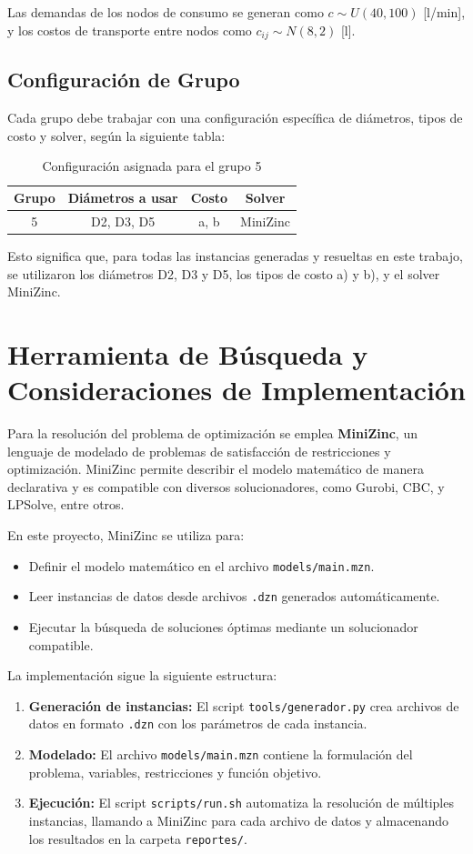 \documentclass[a4paper,12pt]{article}
\begin{document}
Las demandas de los nodos de consumo se generan como $c \sim U(40,100)$ [l/min], y los costos de transporte entre nodos como $c_{ij} \sim N(8,2)$ [l].

\subsection{Configuración de Grupo}
Cada grupo debe trabajar con una configuración específica de diámetros, tipos de costo y solver, según la siguiente tabla:

\begin{table}[H]
\centering
\begin{tabular}{|c|c|c|c|}
\hline
\textbf{Grupo} & \textbf{Diámetros a usar} & \textbf{Costo} & \textbf{Solver} \\
\hline
5 & D2, D3, D5 & a, b & MiniZinc \\
\hline
\end{tabular}
\caption{Configuración asignada para el grupo 5}
\end{table}

Esto significa que, para todas las instancias generadas y resueltas en este trabajo, se utilizaron los diámetros D2, D3 y D5, los tipos de costo a) y b), y el solver MiniZinc.

\section{Herramienta de Búsqueda y Consideraciones de Implementación}
Para la resolución del problema de optimización se emplea \textbf{MiniZinc}, un lenguaje de modelado de problemas de satisfacción de restricciones y optimización. MiniZinc permite describir el modelo matemático de manera declarativa y es compatible con diversos solucionadores, como Gurobi, CBC, y LPSolve, entre otros.

En este proyecto, MiniZinc se utiliza para:
\begin{itemize}
    \item Definir el modelo matemático en el archivo \texttt{models/main.mzn}.
    \item Leer instancias de datos desde archivos \texttt{.dzn} generados automáticamente.
    \item Ejecutar la búsqueda de soluciones óptimas mediante un solucionador compatible.
\end{itemize}

La implementación sigue la siguiente estructura:
\begin{enumerate}
    \item \textbf{Generación de instancias:} El script \texttt{tools/generador.py} crea archivos de datos en formato \texttt{.dzn} con los parámetros de cada instancia.
    \item \textbf{Modelado:} El archivo \texttt{models/main.mzn} contiene la formulación del problema, variables, restricciones y función objetivo.
    \item \textbf{Ejecución:} El script \texttt{scripts/run.sh} automatiza la resolución de múltiples instancias, llamando a MiniZinc para cada archivo de datos y almacenando los resultados en la carpeta \texttt{reportes/}.
\end{enumerate}
\end{document}
